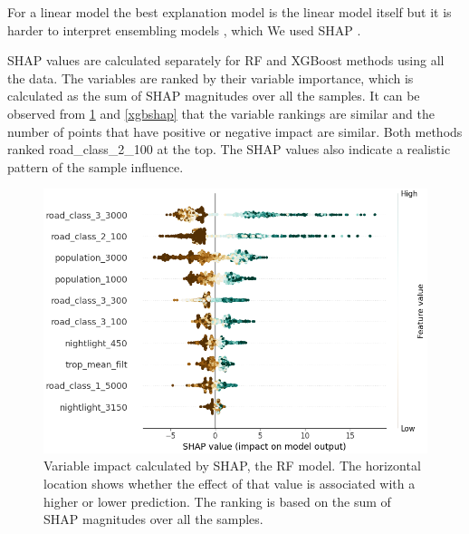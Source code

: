 \documentclass{article}
\begin{document}
For a linear model the best explanation model is the linear model itself but it is harder to interpret ensembling models \citep{NIPS2017_8a20a862}, which We used SHAP \citep{NIPS2017_8a20a862}.

SHAP values are calculated separately for RF and XGBoost methods using all the data. The variables are ranked by their variable importance, which is calculated as the sum of SHAP magnitudes over all the samples. It can be observed from \cref{rfshap} and \cref{xgbshap} that the variable rankings are similar and the number of points that have positive or negative impact are similar. Both methods ranked road\_class\_2\_100 at the top. The SHAP values also indicate a realistic pattern of the sample influence. 

\begin{figure}
\centering
\includegraphics[scale = 0.5]{fig/rfshap.png}
\caption{Variable impact calculated by SHAP, the RF model. The horizontal location shows whether the effect of that value is associated with a higher or lower prediction. The ranking is based on the sum of SHAP magnitudes over all the samples.}
\label{rfshap}
\end{figure}
\end{document}
